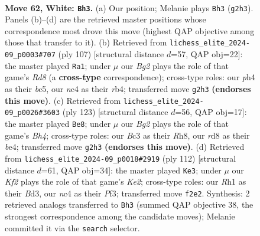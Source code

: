 \documentclass[11pt]{article}
\begin{document}
\clearpage

\begin{figure}[p]\centering
\begin{subfigure}{0.46\textwidth}\centering
\resizebox{\linewidth}{!}{%
\newchessgame
\chessboard[
  setfen={3r4/4b3/p2p2kp/4p3/2n1P2p/2B2P2/5KB1/7R w - - 0 62},
  showmover=false,
  pgfstyle=straightmove, color=movearrow, markmove={g2-h3}
]}
\caption{}
\end{subfigure}\hfill
\begin{subfigure}{0.46\textwidth}\centering
\resizebox{\linewidth}{!}{%
\newchessgame
\chessboard[
  setfen={8/5pk1/5bp1/2B4p/1R5P/6P1/5PK1/3r4 b - - 0 54},
  showmover=false,
  pgfstyle=straightmove, color=movearrow, markmove={d1-a1}
]}
\caption{}
\end{subfigure}
\\[4pt]
\begin{subfigure}{0.46\textwidth}\centering
\resizebox{\linewidth}{!}{%
\newchessgame
\chessboard[
  setfen={7r/1R5P/7k/4P1pb/1p2B3/pP3PK1/P7/8 b - - 4 62},
  showmover=false,
  pgfstyle=straightmove, color=movearrow, markmove={h5-e8}
]}
\caption{}
\end{subfigure}\hfill
\begin{subfigure}{0.46\textwidth}\centering
\resizebox{\linewidth}{!}{%
\newchessgame
\chessboard[
  setfen={4bk2/5pp1/3n3p/1p6/1P2P1PP/3B1P2/4K3/8 w - - 0 57},
  showmover=false,
  pgfstyle=straightmove, color=movearrow, markmove={e2-e3}
]}
\caption{}
\end{subfigure}
\caption{\textbf{Move 62, White: \texttt{Bh3}.} (a) Our position; Melanie plays \texttt{Bh3} (\texttt{g2h3}). Panels (b)--(d) are the retrieved master positions whose correspondence most drove this move (highest QAP objective among those that transfer to it). (b) Retrieved from \texttt{lichess\_elite\_2024-09\_p0003\#707} (ply 107) [structural distance $d$=57, QAP obj=22]: the master played \texttt{Ra1}; under $\mu$ our \emph{Bg2} plays the role of that game's \emph{Rd8} (a \textbf{cross-type} correspondence); cross-type roles: our \emph{p}h4 as their \emph{b}c5, our \emph{n}c4 as their \emph{r}b4; transferred move \texttt{g2h3} \textbf{(endorses this move)}. (c) Retrieved from \texttt{lichess\_elite\_2024-09\_p0026\#3603} (ply 123) [structural distance $d$=56, QAP obj=17]: the master played \texttt{Be8}; under $\mu$ our \emph{Bg2} plays the role of that game's \emph{Bh4}; cross-type roles: our \emph{B}c3 as their \emph{R}h8, our \emph{r}d8 as their \emph{b}e4; transferred move \texttt{g2h3} \textbf{(endorses this move)}. (d) Retrieved from \texttt{lichess\_elite\_2024-09\_p0018\#2919} (ply 112) [structural distance $d$=61, QAP obj=34]: the master played \texttt{Ke3}; under $\mu$ our \emph{Kf2} plays the role of that game's \emph{Ke2}; cross-type roles: our \emph{R}h1 as their \emph{B}d3, our \emph{n}c4 as their \emph{P}f3; transferred move \texttt{f2e2}. Synthesis: 2 retrieved analogs transferred to \texttt{Bh3} (summed QAP objective 38, the strongest correspondence among the candidate moves); Melanie committed it via the \texttt{search} selector.}
\label{fig:thought-m122}
\end{figure}
\end{document}

